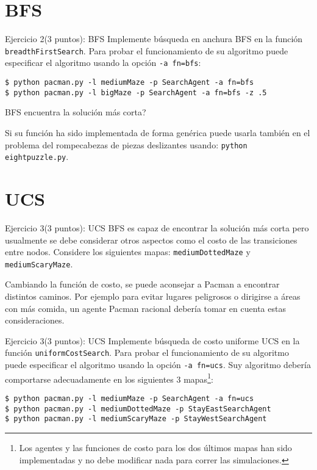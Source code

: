 \documentclass[10pt]{beamer}
\begin{document}
\section{BFS}
\begin{frame}[fragile]{Ejercicio 2(3 puntos): BFS}
Implemente búsqueda en anchura BFS en la función \texttt{breadthFirstSearch}. Para probar 
el funcionamiento de su algoritmo puede especificar el algoritmo usando la opción \texttt{-a fn=bfs}:

\begin{lstlisting}
$ python pacman.py -l mediumMaze -p SearchAgent -a fn=bfs
$ python pacman.py -l bigMaze -p SearchAgent -a fn=bfs -z .5
\end{lstlisting}

BFS encuentra la solución más corta?

Si su función ha sido implementada de forma genérica puede usarla también en el problema del 
rompecabezas de piezas deslizantes usando: \texttt{python eightpuzzle.py}.
\end{frame}

\section{UCS}

\begin{frame}[fragile]{Ejercicio 3(3 puntos): UCS}
BFS es capaz de encontrar la solución más corta pero usualmente se debe considerar otros 
aspectos como el costo de las transiciones entre nodos. Considere los siguientes mapas:
\texttt{mediumDottedMaze} y \texttt{mediumScaryMaze}.

Cambiando la función de costo, se puede aconsejar a Pacman a encontrar distintos caminos. Por 
ejemplo para evitar lugares peligrosos o dirigirse a áreas con más comida, un agente Pacman racional
debería tomar en cuenta estas consideraciones.

\end{frame}

\begin{frame}[fragile]{Ejercicio 3(3 puntos): UCS}
Implemente búsqueda de costo uniforme UCS en la función \texttt{uniformCostSearch}. Para probar 
el funcionamiento de su algoritmo puede especificar el algoritmo usando la opción \texttt{-a fn=ucs}. 
Suy algoritmo debería comportarse adecuadamente en los siguientes 3 mapas\footnote{Los agentes y las 
funciones de costo para los dos últimos mapas han sido implementadas y no debe modificar nada para correr 
las simulaciones.}:

\begin{lstlisting}
$ python pacman.py -l mediumMaze -p SearchAgent -a fn=ucs
$ python pacman.py -l mediumDottedMaze -p StayEastSearchAgent
$ python pacman.py -l mediumScaryMaze -p StayWestSearchAgent
\end{lstlisting}

\end{frame}
\end{document}
